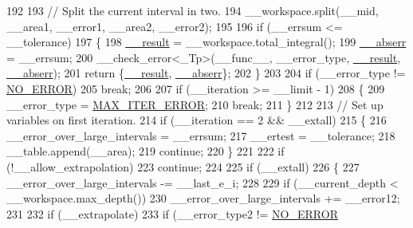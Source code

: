 \begin{DoxyCode}
192 
193           \textcolor{comment}{// Split the current interval in two.}
194           \_\_workspace.split(\_\_mid, \_\_area1, \_\_error1, \_\_area2, \_\_error2);
195 
196           \textcolor{keywordflow}{if} (\_\_errsum <= \_\_tolerance)
197             \{
198               \hyperlink{namespace____gnu__cxx_a500ea9f53aeaecd8c2ae657503450578}{\_\_result} = \_\_workspace.total\_integral();
199               \hyperlink{namespace____gnu__cxx_a72f736cff127f1574e91a301de9e074b}{\_\_abserr} = \_\_errsum;
200               \_\_check\_error<\_Tp>(\_\_func\_\_, \_\_error\_type, \hyperlink{namespace____gnu__cxx_a500ea9f53aeaecd8c2ae657503450578}{\_\_result}, 
      \hyperlink{namespace____gnu__cxx_a72f736cff127f1574e91a301de9e074b}{\_\_abserr});
201               \textcolor{keywordflow}{return} \{\hyperlink{namespace____gnu__cxx_a500ea9f53aeaecd8c2ae657503450578}{\_\_result}, \hyperlink{namespace____gnu__cxx_a72f736cff127f1574e91a301de9e074b}{\_\_abserr}\};
202             \}
203 
204           \textcolor{keywordflow}{if} (\_\_error\_type != \hyperlink{namespace____gnu__cxx_ad6c62dd86a596716cece6ac2d4cfd4b3ac31eecc280b10dec2efb4a2216ccc2e0}{NO\_ERROR})
205             \textcolor{keywordflow}{break};
206 
207           \textcolor{keywordflow}{if} (\_\_iteration >= \_\_limit - 1)
208             \{
209               \_\_error\_type = \hyperlink{namespace____gnu__cxx_ad6c62dd86a596716cece6ac2d4cfd4b3a420d46d10205dd953d0ccce5323afc4c}{MAX\_ITER\_ERROR};
210               \textcolor{keywordflow}{break};
211             \}
212 
213           \textcolor{comment}{// Set up variables on first iteration.}
214           \textcolor{keywordflow}{if} (\_\_iteration == 2 && \_\_extall)
215             \{
216               \_\_error\_over\_large\_intervals = \_\_errsum;
217               \_\_ertest = \_\_tolerance;
218               \_\_table.append(\_\_area);
219               \textcolor{keywordflow}{continue};
220             \}
221 
222           \textcolor{keywordflow}{if} (!\_\_allow\_extrapolation)
223             \textcolor{keywordflow}{continue};
224 
225           \textcolor{keywordflow}{if} (\_\_extall)
226             \{
227               \_\_error\_over\_large\_intervals -= \_\_last\_e\_i;
228 
229               \textcolor{keywordflow}{if} (\_\_current\_depth < \_\_workspace.max\_depth())
230                 \_\_error\_over\_large\_intervals += \_\_error12;
231 
232               \textcolor{keywordflow}{if} (\_\_extrapolate)
233                 \textcolor{keywordflow}{if} (\_\_error\_type2 != \hyperlink{namespace____gnu__cxx_ad6c62dd86a596716cece6ac2d4cfd4b3ac31eecc280b10dec2efb4a2216ccc2e0}{NO\_ERROR}

\end{DoxyCode}
